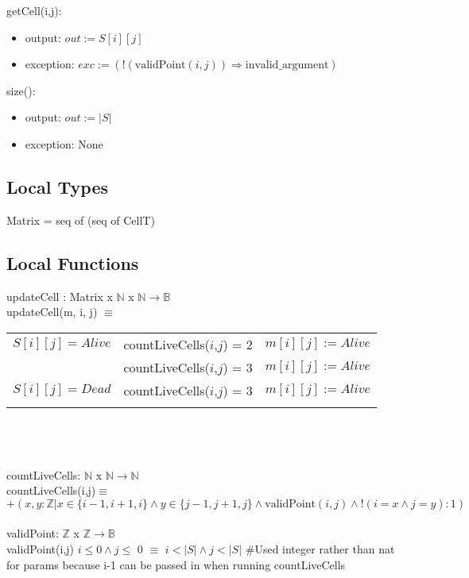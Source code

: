 \documentclass[12pt]{article}
\begin{document}
\noindent getCell(i,j):
\begin{itemize}
\item output: $out := S[i][j]$

\item exception: $exc := (!(\text{validPoint}(i,j)) \Rightarrow \text{invalid\_argument})$

\end{itemize}

\noindent size():
\begin{itemize}
\item output: $\mathit{out} := |S|$
\item exception: None
\end{itemize}

\subsection*{Local Types}

Matrix = seq of (seq of CellT)

\subsection*{Local Functions}
updateCell : Matrix x $\mathbb{N}$ x $\mathbb{N} \rightarrow \mathbb{B}$\\
updateCell(m, i, j) $\equiv$

\begin{tabular}{|p{4cm}|p{5cm}|l|}
\hhline{|-|-|-|}
$S[i][j] = Alive$ & countLiveCells($i$,$j$) = 2 & $m[i][j] := Alive$\\
\hhline{|~|-|-|}
 & countLiveCells($i$,$j$) = 3 & $m[i][j] := Alive$\\
\hhline{|-|-|-|}
$S[i][j] = Dead$ & countLiveCells($i$,$j$) = 3 & $m[i][j] := Alive$\\
\hhline{|-|-|-|}
\end{tabular}\\\\\\
countLiveCells: $\mathbb{N}$ x $\mathbb{N} \rightarrow \mathbb{N}$\\
countLiveCells(i,j)$\equiv$ $+(x,y:\mathbb{Z}| x \in \{i-1,i+1,i\} \land y \in \{j-1,j+1,j\} \land \text{validPoint}(i,j) \land !(i = x \land j = y): 1)$\\\\
validPoint: $\mathbb{Z}$ x $\mathbb{Z} \rightarrow \mathbb{B}$\\
validPoint(i,j) $i \leq 0 \land j \leq$ 0 \land $\equiv$ $i < |S| \land j < |S| $ \#Used integer rather than nat for params because i-1 can be passed in when running countLiveCells
\end{document}
